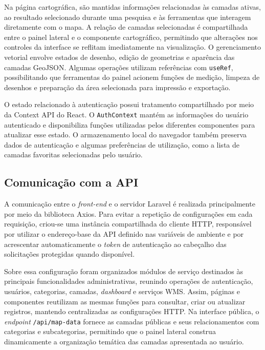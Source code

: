 Na página cartográfica, são mantidas informações relacionadas às camadas ativas, ao resultado selecionado durante uma pesquisa e às ferramentas que interagem diretamente com o mapa. A relação de camadas selecionadas é compartilhada entre o painel lateral e o componente cartográfico, permitindo que alterações nos controles da interface se reflitam imediatamente na visualização. O gerenciamento vetorial envolve estados de desenho, edição de geometrias e aparência das camadas GeoJSON. Algumas operações utilizam referências com \texttt{useRef}, possibilitando que ferramentas do painel acionem funções de medição, limpeza de desenhos e preparação da área selecionada para impressão e exportação.

O estado relacionado à autenticação possui tratamento compartilhado por meio da Context API do React. O \texttt{AuthContext} mantém as informações do usuário autenticado e disponibiliza funções utilizadas pelos diferentes componentes para atualizar esse estado. O armazenamento local do navegador também preserva dados de autenticação e algumas preferências de utilização, como a lista de camadas favoritas selecionadas pelo usuário.

\subsection{Comunicação com a API}
\label{sec:integracao-api-frontend}

A comunicação entre o \textit{front-end} e o servidor Laravel é realizada principalmente por meio da biblioteca Axios. Para evitar a repetição de configurações em cada requisição, criou-se uma instância compartilhada do cliente HTTP, responsável por utilizar o endereço-base da API definido nas variáveis de ambiente e por acrescentar automaticamente o \textit{token} de autenticação ao cabeçalho das solicitações protegidas quando disponível.

Sobre essa configuração foram organizados módulos de serviço destinados às principais funcionalidades administrativas, reunindo operações de autenticação, usuários, categorias, camadas, \textit{dashboard} e serviços WMS. Assim, páginas e componentes reutilizam as mesmas funções para consultar, criar ou atualizar registros, mantendo centralizadas as configurações HTTP. Na interface pública, o \textit{endpoint} \texttt{/api/map-data} fornece as camadas públicas e seus relacionamentos com categorias e subcategorias, permitindo que o painel lateral construa dinamicamente a organização temática das camadas apresentada ao usuário.

